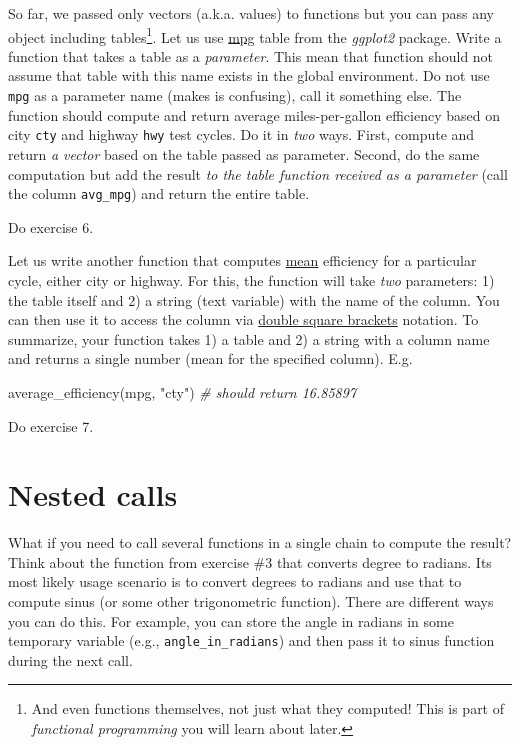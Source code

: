 \documentclass[
]{book}
\newenvironment{Shaded}{\begin{snugshade}}{\end{snugshade}}
\newcommand{\CommentTok}[1]{\textcolor[rgb]{0.56,0.35,0.01}{\textit{#1}}}
\newcommand{\FunctionTok}[1]{\textcolor[rgb]{0.00,0.00,0.00}{#1}}
\newcommand{\NormalTok}[1]{#1}
\newcommand{\StringTok}[1]{\textcolor[rgb]{0.31,0.60,0.02}{#1}}
\begin{document}
So far, we passed only vectors (a.k.a. values) to functions but you can pass any object including tables\footnote{And even functions themselves, not just what they computed! This is part of \emph{functional programming} you will learn about later.}. Let us use \href{https://ggplot2.tidyverse.org/reference/mpg.html}{mpg} table from the \emph{ggplot2} package. Write a function that takes a table as a \emph{parameter}. This mean that function should not assume that table with this name exists in the global environment. Do not use \texttt{mpg} as a parameter name (makes is confusing), call it something else. The function should compute and return average miles-per-gallon efficiency based on city \texttt{cty} and highway \texttt{hwy} test cycles. Do it in \emph{two} ways. First, compute and return \emph{a vector} based on the table passed as parameter. Second, do the same computation but add the result \emph{to the table function received as a parameter} (call the column \texttt{avg\_mpg}) and return the entire table.

Do exercise 6.

Let us write another function that computes \href{https://stat.ethz.ch/R-manual/R-devel/library/base/html/mean.html}{mean} efficiency for a particular cycle, either city or highway. For this, the function will take \emph{two} parameters: 1) the table itself and 2) a string (text variable) with the name of the column. You can then use it to access the column via \protect\hyperlink{get-single-column}{double square brackets} notation. To summarize, your function takes 1) a table and 2) a string with a column name and returns a single number (mean for the specified column). E.g.

\begin{Shaded}
\begin{Highlighting}[]
\FunctionTok{average\_efficiency}\NormalTok{(mpg, }\StringTok{"cty"}\NormalTok{) }\CommentTok{\# should return 16.85897}
\end{Highlighting}
\end{Shaded}

Do exercise 7.

\hypertarget{nested-calls}{%
\section{Nested calls}\label{nested-calls}}

What if you need to call several functions in a single chain to compute the result? Think about the function from exercise \#3 that converts degree to radians. Its most likely usage scenario is to convert degrees to radians and use that to compute sinus (or some other trigonometric function). There are different ways you can do this. For example, you can store the angle in radians in some temporary variable (e.g., \texttt{angle\_in\_radians}) and then pass it to sinus function during the next call.
\end{document}

